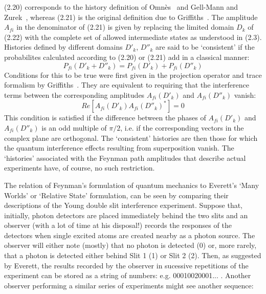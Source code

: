 {  (2.20) corresponds to the history definition of Omn\`{e}s~\cite{Omnes} and
   Gell-Mann and Zurek~\cite{GMH}, whereas (2.21) is the original definition due to 
   Griffiths~\cite{Griffiths}. The amplitude $A_{fi}$ in the denominator of (2.21)
   is given by replacing the limited domain $D_k$ of (2.22) with the complete set of allowed
   intermediate states as understood in (2.3). Histories defined by different domains
   $D'_k$, $D''_k$ are said to be `consistent' if the probabilites calculated according to
  (2.20) or (2.21) add in a classical manner:
  \begin{equation}
  P_{fi}(D'_k +D''_k) =  P_{fi}(D'_k) +  P_{fi}(D''_k) 
  \end{equation}  
   Conditions for this to be true were first given in the projection operator and
   trace formalism by Griffiths~\cite{Griffiths}. They are equivalent to requiring that
    the interference terms between the corresponding amplitudes $A_{fi}(D'_k)$ and 
    $A_{fi}(D''_k)$ vanish:
   \begin{equation}
  Re\left[A_{fi}(D'_k)A_{fi}(D''_k)^{\ast}\right] = 0
   \end{equation}
   This condition is satisfied if the difference between the phases of $A_{fi}(D'_k)$ and 
    $A_{fi}(D''_k)$ is an odd multiple of $\pi/2$, i.e. if the corresponding vectors in 
   the complex plane are orthogonal. The `consistent' histories are then those for which
   the quantum interference effects resulting from superposition vanish. The `histories'
   associated with the  Feynman path amplitudes that describe actual experiments have,
   of course, no such restriction.
   \par The relation of Feynman's formulation of quantum mechanics to Everett's
    `Many Worlds' or `Relative State' formulation, can be
   seen by comparing their descriptions of the Young double slit interference
   experiment. Suppose that, initially, photon detectors are placed immediately
   behind the two slits and an observer (with a lot of time at his disposal!) records
   the responses of the detectors when single excited atoms are created nearby as
   a photon source. The observer will either note (mostly) that no photon is detected (0)
   or, more rarely, that a photon is detected either behind Slit 1 (1) or Slit 2 (2).
   Then, as suggested by Everett, the results recorded by the observer in sucessive
   repetitions of the experiment can be stored as a string of numbers: e.g. 00010020001... .
 Another observer performing a similar series of experiments might see another sequence:
}
